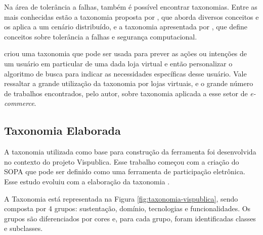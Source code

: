 \vspace{0.5cm}
\par
Na área de tolerância a falhas, também é possível encontrar taxonomias. Entre as mais conhecidas estão a taxonomia proposta por
, que aborda diversos conceitos e os aplica a um cenário distribuído,
e a taxonomia apresentada por , que define conceitos sobre tolerância a falhas e segurança computacional.

\par
{} criou uma taxonomia que pode ser usada para prever as ações ou intenções de um usuário em particular de uma dada loja virtual
e então personalizar o algoritmo de busca para indicar as necessidades específicas desse usuário. Vale ressaltar a grande utilização da taxonomia por lojas virtuais, 
e o grande número de trabalhos encontrados, pelo autor, sobre taxonomia aplicada a esse setor de \textit{e-commerce}.

\subsection{Taxonomia Elaborada}
\label{subsec:taxonomiaElaborada}
\par
A taxonomia utilizada como base para construção da ferramenta foi desenvolvida no contexto do projeto Vispublica. Esse trabalho começou com a criação do SOPA que pode ser definido como uma 
ferramenta de participação eletrônica. Esse estudo evoluiu com a elaboração da taxonomia . 

\par
A Taxonomia está representada na Figura \ref{fig:taxonomia-vispublica}, sendo composta por 4 grupos: sustentação, domínio, tecnologias e funcionalidades.
Os grupos são diferenciados por cores e, para cada grupo, foram identificadas classes e subclasses.

